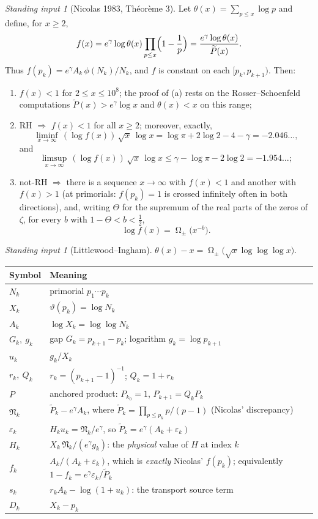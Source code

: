 \documentclass[11pt]{article}
\theoremstyle{remark}
\newtheorem{fact}[theorem]{Standing input}
\newcommand{\Nk}{N_k}
\newcommand{\Xk}{X_k}
\newcommand{\Ak}{A_k}
\newcommand{\uk}{u_k}
\newcommand{\rk}{r_k}
\newcommand{\eps}{\varepsilon}
\newcommand{\Nn}{\mathfrak{N}}
\newcommand{\Ptil}{\widetilde P}
\newcommand{\gam}{\gamma}
\DeclareMathOperator{\Om}{\Omega}
\begin{document}
\begin{fact}[Nicolas 1983, Th\'eor\`eme 3]\label{f:Nicolas}
Let $\theta(x)=\sum_{p\le x}\log p$ and define, for $x\ge2$,
\[
f(x)=e^\gam\log\theta(x)\prod_{p\le x}\Bigl(1-\frac1p\Bigr)
     =\frac{e^\gam\log\theta(x)}{\Ptil(x)} .
\]
Thus $f(p_k)=e^\gam\Ak\,\phi(\Nk)/\Nk$, and $f$ is constant on each
$[p_k,p_{k+1})$. Then:
\begin{enumerate}
\item[(a)] $f(x)<1$ for $2\le x\le 10^8$; the proof of (a) rests on the
Rosser--Schoenfeld computations $\Ptil(x)>e^\gam\log x$ and $\theta(x)<x$ on
this range;
\item[(b)] \textup{RH} $\Rightarrow$ $f(x)<1$ for all $x\ge2$; moreover,
exactly,
\[
\liminf_{x\to\infty}\,(\log f(x))\,\sqrt{x}\,\log x
=\log\pi+2\log 2-4-\gam=-2.046\dots,
\]
and
\[
\limsup_{x\to\infty}\,(\log f(x))\,\sqrt{x}\,\log x
\le \gam-\log\pi-2\log 2=-1.954\dots ;
\]
\item[(c)] \textup{not-RH} $\Rightarrow$ there is a sequence $x\to\infty$ with
$f(x)<1$ and another with $f(x)>1$ (at primorials: $f(p_k)=1$ is crossed
infinitely often in both directions), and, writing $\Theta$ for the supremum
of the real parts of the zeros of $\zeta$, for every $b$ with
$1-\Theta<b<\tfrac12$,
\[
\log f(x)=\Om_\pm\bigl(x^{-b}\bigr).
\]
\end{enumerate}
\end{fact}

\begin{fact}[Littlewood--Ingham]\label{f:LI}
$\theta(x)-x=\Om_\pm\!\bigl(\sqrt{x}\log\log\log x\bigr)$.
\end{fact}

\begin{center}
\begin{tabular}{@{}ll@{}}
\toprule
Symbol & Meaning \\
\midrule
$\Nk$ & primorial $p_1\cdots p_k$\\
$\Xk$ & $\vartheta(p_k)=\log \Nk$\\
$\Ak$ & $\log \Xk=\log\log \Nk$\\
$G_k,\ g_k$ & gap $G_k=p_{k+1}-p_k$; logarithm $g_k=\log p_{k+1}$\\
$\uk$ & $g_k/\Xk$\\
$\rk,\ Q_k$ & $\rk=(p_{k+1}-1)^{-1}$; $Q_k=1+\rk$\\
$P$ & anchored product: $P_{k_0}=1$, $P_{k+1}=Q_kP_k$\\
$\Nn_k$ & $\Ptil_k-e^\gam \Ak$, where $\Ptil_k=\prod_{p\le p_k}p/(p-1)$ (Nicolas' discrepancy)\\
$\eps_k$ & $H_k\uk=\Nn_k/e^\gam$, so $\Ptil_k=e^\gam(\Ak+\eps_k)$\\
$H_k$ & $\Xk\,\Nn_k/(e^\gam g_k)$: the \emph{physical} value of $H$ at index $k$\\
$f_k$ & $\Ak/(\Ak+\eps_k)$, which is \emph{exactly} Nicolas' $f(p_k)$; equivalently
$1-f_k=e^\gam\eps_k/\Ptil_k$\\
$s_k$ & $\rk \Ak-\log(1+\uk)$: the transport source term\\
$D_k$ & $\Xk-p_k$\\
\bottomrule
\end{tabular}
\end{center}
\end{document}
